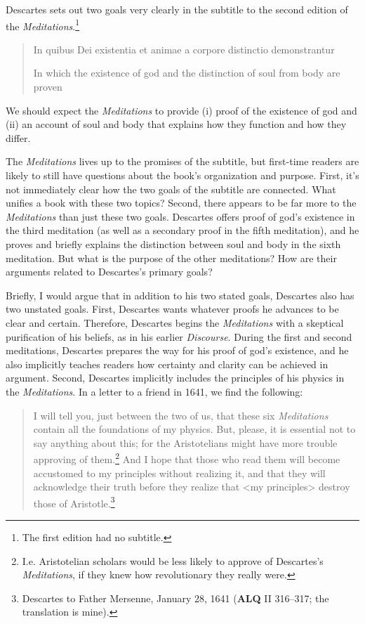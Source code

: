 Descartes sets out two goals very clearly in the subtitle to the second edition of the \textit{Meditations}.\footnote{The first edition had no subtitle.}

\begin{quote}
    In quibus Dei existentia et animae a corpore distinctio demonstrantur

    In which the existence of god and the distinction of soul from body are proven
\end{quote}
We should expect the \textit{Meditations} to provide (i) proof of the existence of god and (ii) an account of soul and body that explains how they function and how they differ.

The \textit{Meditations} lives up to the promises of the subtitle, but first-time readers are likely to still have questions about the book's organization and purpose. First, it's not immediately clear how the two goals of the subtitle are connected. What unifies a book with these two topics? Second, there appears to be far more to the \textit{Meditations} than just these two goals. Descartes offers proof of god's existence in the third meditation (as well as a secondary proof in the fifth meditation), and he proves and briefly explains the distinction between soul and body in the sixth meditation. But what is the purpose of the other meditations? How are their arguments related to Descartes's primary goals?

Briefly, I would argue that in addition to his two stated goals, Descartes also has two unstated goals. First, Descartes wants whatever proofs he advances to be clear and certain. Therefore, Descartes begins the \textit{Meditations} with a skeptical purification of his beliefs, as in his earlier \textit{Discourse}. During the first and second meditations, Descartes prepares the way for his proof of god's existence, and he also implicitly teaches readers how certainty and clarity can be achieved in argument. Second, Descartes implicitly includes the principles of his physics in the \textit{Meditations}. In a letter to a friend in 1641, we find the following:

\begin{quote}
    I will tell you, just between the two of us, that these six \textit{Meditations} contain all the foundations of my physics. But, please, it is essential not to say anything about this; for the Aristotelians might have more trouble approving of them.\footnote{I.e. Aristotelian scholars would be less likely to approve of Descartes's \textit{Meditations}, if they knew how revolutionary they really were.} And I hope that those who read them will become accustomed to my principles without realizing it, and that they will acknowledge their truth before they realize that <my principles> destroy those of Aristotle.\footnote{Descartes to Father Mersenne, January 28, 1641 (\textbf{ALQ} II 316--317; the translation is mine).}
\end{quote}

